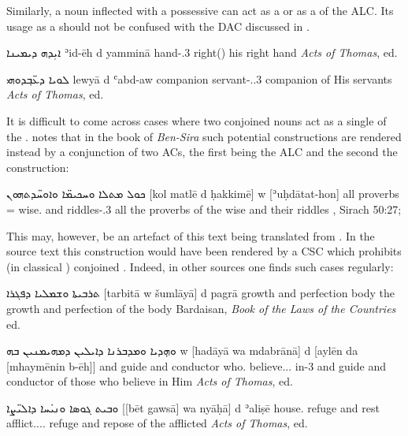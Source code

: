 {{ Similarly, a noun inflected with a possessive  can act as a \prim or as a \secn of the ALC. Its usage as a \prim should not be confused with the DAC discussed in . 
 
 {ܐܝܼܕܗ ܕܝܡܝܢܐ}
 {ʾid-ēh d\cb{} yamminā}
 {hand-\poss.3\masc{} \lnk\cb{} right(\fem)}
 {his right hand}
 {\textit{Acts of Thomas}, ed.\ \cite[]{WrightActs}}
 
 {ܠܘܝܐ ܕܥ̈ܒ݂ܕܘܗܝ}
 {lewyā d\cb{} ʿabd-aw}
 {companion \lnk\cb{} servant-\pl.\poss.3\masc}
 {companion of His servants}
 {\textit{Acts of Thomas}, ed.\ \cite[]{WrightActs}}\antipar
 \newpage 
 
  It is difficult to come across cases where two conjoined nouns act as a single \prim of the . \citet[204]{PeursenBenSira} notes that in the book of \textit{Ben-Sira} such potential constructions are rendered instead by a conjunction of two ACs, the first being the ALC and the second the  construction:
 
{ܟܘܠ ܡܬܠܐ ܘܚܟܝܡ̈ܐ ܘܐܘܚ̈ܕܬܗܘܢ}
{[kol matlē d\cb{} ḥakkimē] w\cb{} [ʾuḥdātat-hon]}
{all proverbs \lnk= wise.\pl{} and\cb{} riddles-\poss.3\pl}
{all the proverbs of the wise and their riddles}
{\Pesh, Sirach 50:27; \cite[204]{PeursenBenSira}}
 
This may, however, be an artefact of this text being translated from . In the source text this construction would have been rendered by a CSC which prohibits (in classical ) conjoined \prims. Indeed, in other sources one finds such cases regularly:

{ܬܪܒܝܬܐ ܘܫܡܠܝܐ ܕܦܓܪܐ}
{[tarbitā w\cb{} šumlāyā] d\cb{} pagrā}
{growth and\cb{} perfection \lnk\cb{} body}
{the growth and perfection of the body}
{Bardaisan, \textit{Book of the Laws of the Countries} ed. \cite[34:14]{Drijvers} \apud \cite[123]{BakkerBardaisan}}


{ܘܗ̣ܕܝܐ ܘܡܕܒܪܢܐ ܕܐܝܠܝܢ ܕܡܗܝܡܢܝܢ ܒܗ}
{w\cb{} [hadāyā wa\cb{} mdabrānā] d\cb{} [aylēn da\cb{} [mhaymēnin b-ēh]]}
{and\cb{} guide and\cb{} conductor \lnk\cb{} who.\pl{} \lnk\cb{} believe.\ptcp.\mpl.\abs{} in-3\masc}
{and guide and conductor of those who believe in Him}
{\textit{Acts of Thomas}, ed.\ \cite[]{WrightActs}}

{ܘܒܝܬ ܓܘܣܐ ܘܢܝ̇ܚܐ ܕܐܠܝ̈ܨ\hspace{-0.7ex}ܐ}
{[[bēt gawsā] wa\cb{} nyāḥā] d\cb{} ʾaliṣē}
{house.\cst{} refuge and\cb{} rest \lnk\cb{} afflict.\pass.\ptcp.\emp.\mpl}
{refuge and repose of the afflicted} 
{\textit{Acts of Thomas}, ed.\ \cite[]{WrightActs}}

}}
